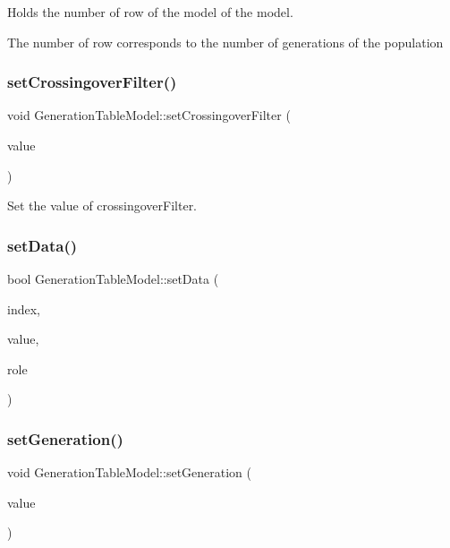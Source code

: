 Holds the number of row of the model of the model. 

The number of row corresponds to the number of generations of the population \mbox{\label{class_generation_table_model_aa53056b850a7ca6f77deb5bdf312e52e}} 
\subsubsection{\texorpdfstring{set\+Crossingover\+Filter()}{setCrossingoverFilter()}}
{\footnotesize\ttfamily void Generation\+Table\+Model\+::set\+Crossingover\+Filter (\begin{DoxyParamCaption}\item[{bool}]{value }\end{DoxyParamCaption})}



Set the value of crossingover\+Filter. 

\mbox{\label{class_generation_table_model_a8e66c46d9427fe327baecdbf107637f8}} 
\subsubsection{\texorpdfstring{set\+Data()}{setData()}}
{\footnotesize\ttfamily bool Generation\+Table\+Model\+::set\+Data (\begin{DoxyParamCaption}\item[{const Q\+Model\+Index \&}]{index,  }\item[{const Q\+Variant \&}]{value,  }\item[{int}]{role }\end{DoxyParamCaption})}

\mbox{\label{class_generation_table_model_ad288b648745cacc9c46aee376e0c6dda}} 
\subsubsection{\texorpdfstring{set\+Generation()}{setGeneration()}}
{\footnotesize\ttfamily void Generation\+Table\+Model\+::set\+Generation (\begin{DoxyParamCaption}\item[{int}]{value }\end{DoxyParamCaption})}



